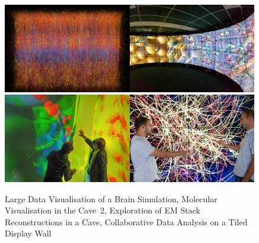 \begin{figure}[h!t]%
\includegraphics[width=0.497\textwidth]{images/slices.jpg}\hfil\includegraphics[width=0.497\textwidth]{images/cave2.jpg}\\%
\includegraphics[width=0.497\textwidth]{images/cave.jpg}\hfil\includegraphics[width=0.497\textwidth]{images/tide.jpg}\\%
\caption{\label{FIG_teaser}Large Data Visualisation of a
  Brain Simulation, Molecular Visualisation in the Cave~2, Exploration of EM
  Stack Reconstructions in a Cave, Collaborative Data Analysis on a Tiled
  Display Wall}
\end{figure}

